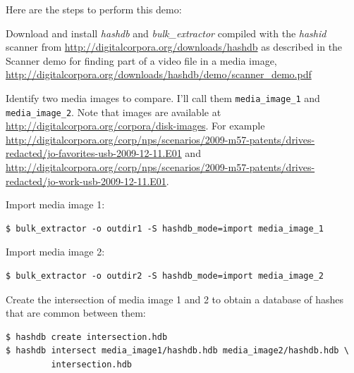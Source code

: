 \documentclass[12pt,twoside]{article}
\newcommand{\hdb}{\emph{hashdb}\xspace}
\newcommand{\bulk}{\emph{bulk\_extractor}\xspace}
\newcommand{\hashid}{\emph{hashid}\xspace}
\begin{document}
Here are the steps to perform this demo:
\begin{compactenum}
\item Download and install \hdb  and \bulk compiled with the \hashid scanner
from
\url{http://digitalcorpora.org/downloads/hashdb}
as described in the Scanner demo
for finding part of a video file in a media image,
\url{http://digitalcorpora.org/downloads/hashdb/demo/scanner\_demo.pdf}
\item Identify two media images to compare.
I'll call them \texttt{media\_image\_1} and \texttt{media\_image\_2}.
Note that images are available at
\url{http://digitalcorpora.org/corpora/disk-images}.
For example
\url{http://digitalcorpora.org/corp/nps/scenarios/2009-m57-patents/drives-redacted/jo-favorites-usb-2009-12-11.E01}
and
\url{http://digitalcorpora.org/corp/nps/scenarios/2009-m57-patents/drives-redacted/jo-work-usb-2009-12-11.E01}.

\item Import media image 1:
\begin{verbatim}
$ bulk_extractor -o outdir1 -S hashdb_mode=import media_image_1
\end{verbatim}

\item Import media image 2:
\begin{verbatim}
$ bulk_extractor -o outdir2 -S hashdb_mode=import media_image_2
\end{verbatim}

\item Create the intersection of media image 1 and 2
to obtain a database of hashes that are common between them:
\begin{verbatim}
$ hashdb create intersection.hdb
$ hashdb intersect media_image1/hashdb.hdb media_image2/hashdb.hdb \
         intersection.hdb
\end{verbatim}
\end{compactenum}
\end{document}
